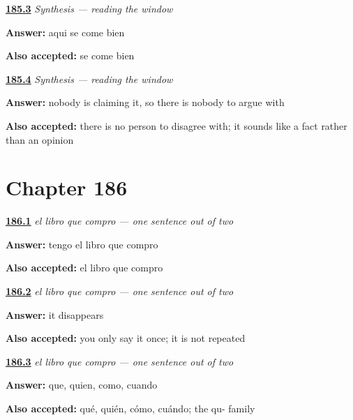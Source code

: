 \noindent\begin{minipage}[t]{\linewidth}
\raggedright
\hyperlink{review-ES-C52-sintesis-el-letrero-eat}{\textbf{185.3}} \emph{Synthesis — reading the window}\par
\small \textbf{Answer:} aqui se come bien\par
\footnotesize \textbf{Also accepted:} se come bien
\end{minipage}\par\medskip

\noindent\begin{minipage}[t]{\linewidth}
\raggedright
\hyperlink{review-ES-C52-sintesis-el-letrero-authority}{\textbf{185.4}} \emph{Synthesis — reading the window}\par
\small \textbf{Answer:} nobody is claiming it, so there is nobody to argue with\par
\footnotesize \textbf{Also accepted:} there is no person to disagree with; it sounds like a fact rather than an opinion
\end{minipage}\par\medskip

\section*{Chapter 186}

\noindent\begin{minipage}[t]{\linewidth}
\raggedright
\hyperlink{review-ES-C53-que-relativo-join}{\textbf{186.1}} \emph{el libro que compro — one sentence out of two}\par
\small \textbf{Answer:} tengo el libro que compro\par
\footnotesize \textbf{Also accepted:} el libro que compro
\end{minipage}\par\medskip

\noindent\begin{minipage}[t]{\linewidth}
\raggedright
\hyperlink{review-ES-C53-que-relativo-what}{\textbf{186.2}} \emph{el libro que compro — one sentence out of two}\par
\small \textbf{Answer:} it disappears\par
\footnotesize \textbf{Also accepted:} you only say it once; it is not repeated
\end{minipage}\par\medskip

\noindent\begin{minipage}[t]{\linewidth}
\raggedright
\hyperlink{review-ES-C53-que-relativo-family}{\textbf{186.3}} \emph{el libro que compro — one sentence out of two}\par
\small \textbf{Answer:} que, quien, como, cuando\par
\footnotesize \textbf{Also accepted:} qué, quién, cómo, cuándo; the qu- family
\end{minipage}\par\medskip


